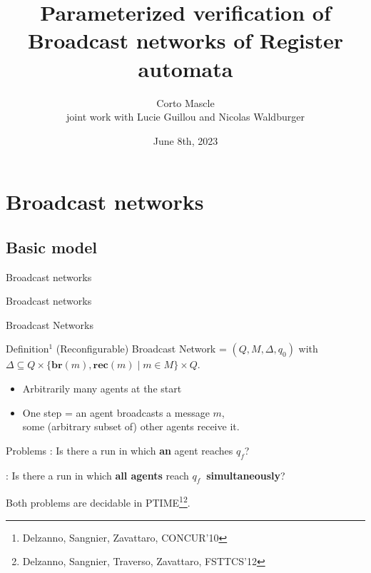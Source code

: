 \documentclass{beamer}
\begin{document}
	
	\title[]{Parameterized verification of Broadcast networks of Register automata}
	\date[]{June 8th, 2023}
	\author[]{Corto Mascle\\ joint work with Lucie Guillou and Nicolas Waldburger}
%	
\begin{frame}
	\titlepage
\end{frame}	

\begin{frame}
	\tableofcontents
\end{frame}

\section{Broadcast networks}

\subsection{Basic model}

\begin{frame}
	\tableofcontents[currentsection]
\end{frame}


\begin{frame}{Broadcast networks}
	
\end{frame}


\begin{frame}{Broadcast networks}
	
\end{frame}

\begin{frame}{Broadcast Networks}
	\begin{block}{Definition$^1$}
		(Reconfigurable) Broadcast Network = $(Q, M, \Delta, q_0)$ with $\Delta \subseteq Q\times \{\mathbf{br}(m), \mathbf{rec}(m) \mid m \in M\} \times Q$.
	\end{block}
	
	\pause
	
	\begin{itemize}
		\item Arbitrarily many agents at the start
		
		\item One step = an agent broadcasts a message $m$,\\ some (arbitrary subset of) other agents receive it.
	\end{itemize}
	
	\pause 
	
	\begin{block}{Problems}
		{}: Is there a run in which \textbf{an} agent reaches \color{blue!60}$q_f$\color{black}?
		
		{}: Is there a run in which \textbf{all agents} reach \color{blue!60}$q_f~$\color{black} \textbf{simultaneously}?
	\end{block}
	
	Both problems are decidable in PTIME\footnote{Delzanno, Sangnier, Zavattaro, CONCUR'10}\footnote{Delzanno, Sangnier, Traverso, Zavattaro, FSTTCS'12}.
\end{frame}
\end{document}
